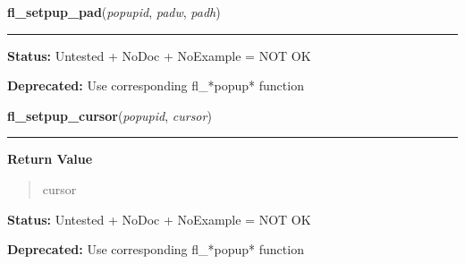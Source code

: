     \label{xformslib:deprecated:fl_setpup_pad}

    \vspace{0.5ex}

\hspace{.8\funcindent}\begin{boxedminipage}{\funcwidth}

    \raggedright \textbf{fl\_setpup\_pad}(\textit{popupid}, \textit{padw}, \textit{padh})

    \vspace{-1.5ex}

    \rule{\textwidth}{0.5\fboxrule}
\setlength{\parskip}{2ex}
\setlength{\parskip}{1ex}
\textbf{Status:} Untested + NoDoc + NoExample = NOT OK



\textbf{Deprecated:} Use corresponding fl\_*popup* function



    \end{boxedminipage}

    \label{xformslib:deprecated:fl_setpup_cursor}

    \vspace{0.5ex}

\hspace{.8\funcindent}\begin{boxedminipage}{\funcwidth}

    \raggedright \textbf{fl\_setpup\_cursor}(\textit{popupid}, \textit{cursor})

    \vspace{-1.5ex}

    \rule{\textwidth}{0.5\fboxrule}
\setlength{\parskip}{2ex}
\setlength{\parskip}{1ex}
      \textbf{Return Value}
    \vspace{-1ex}

      \begin{quote}
      cursor

      \end{quote}

\textbf{Status:} Untested + NoDoc + NoExample = NOT OK



\textbf{Deprecated:} Use corresponding fl\_*popup* function



    \end{boxedminipage}


